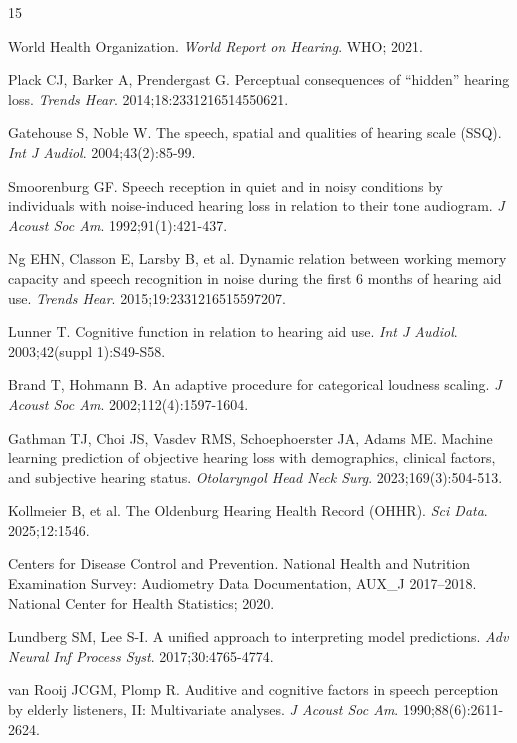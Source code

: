\documentclass[12pt,a4paper]{article}
\begin{document}
\begin{thebibliography}{15}

World Health Organization. \textit{World Report on Hearing}. WHO; 2021.

Plack CJ, Barker A, Prendergast G. Perceptual consequences of ``hidden''
hearing loss. \textit{Trends Hear}. 2014;18:2331216514550621.

Gatehouse S, Noble W. The speech, spatial and qualities of hearing scale
(SSQ). \textit{Int J Audiol}. 2004;43(2):85-99.

Smoorenburg GF. Speech reception in quiet and in noisy conditions by
individuals with noise-induced hearing loss in relation to their tone
audiogram. \textit{J Acoust Soc Am}. 1992;91(1):421-437.

Ng EHN, Classon E, Larsby B, et al. Dynamic relation between working memory
capacity and speech recognition in noise during the first 6 months of hearing
aid use. \textit{Trends Hear}. 2015;19:2331216515597207.

Lunner T. Cognitive function in relation to hearing aid use.
\textit{Int J Audiol}. 2003;42(suppl 1):S49-S58.

Brand T, Hohmann B. An adaptive procedure for categorical loudness scaling.
\textit{J Acoust Soc Am}. 2002;112(4):1597-1604.

Gathman TJ, Choi JS, Vasdev RMS, Schoephoerster JA, Adams ME. Machine
learning prediction of objective hearing loss with demographics, clinical
factors, and subjective hearing status. \textit{Otolaryngol Head Neck Surg}.
2023;169(3):504-513.

Kollmeier B, et al. The Oldenburg Hearing Health Record (OHHR).
\textit{Sci Data}. 2025;12:1546.

Centers for Disease Control and Prevention. National Health and Nutrition
Examination Survey: Audiometry Data Documentation, AUX\_J 2017--2018.
National Center for Health Statistics; 2020.

Lundberg SM, Lee S-I. A unified approach to interpreting model predictions.
\textit{Adv Neural Inf Process Syst}. 2017;30:4765-4774.

van Rooij JCGM, Plomp R. Auditive and cognitive factors in speech perception
by elderly listeners, II: Multivariate analyses.
\textit{J Acoust Soc Am}. 1990;88(6):2611-2624.


\end{thebibliography}
\end{document}
